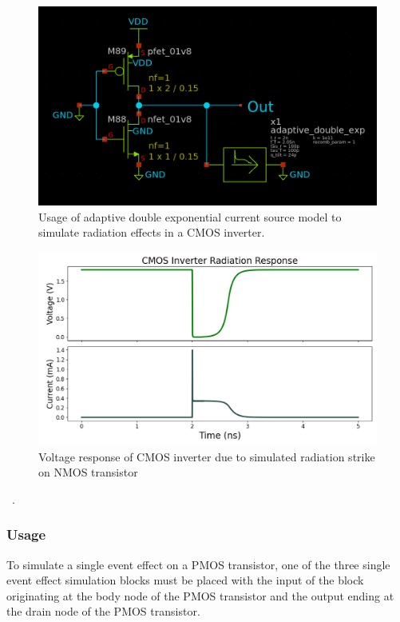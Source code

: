 \documentclass[conference]{IEEEtran}
\begin{document}
    \begin{figure}[htbp]
        \centering
        \includegraphics[width=0.9\linewidth]{Adaptive_Current_Example_Circuit}
        \caption{Usage of adaptive double exponential current source model to simulate radiation effects in a CMOS inverter.}
        \label{fig:adaptive_model_example}
    \end{figure}


    \begin{figure}[htbp]
        \centering
        \includegraphics[width=0.95\linewidth]{Inverter_Response}
        \caption{Voltage response of CMOS inverter due to simulated radiation strike on NMOS transistor}
        \label{fig:inverter_response}
    \end{figure}~\cite{Kauppila2009}.

    \subsubsection{Usage}
    To simulate a single event effect on a PMOS transistor, one of the three single event effect simulation blocks must be placed with the input of the block originating at the body node of the PMOS transistor and the output ending at the drain node of the PMOS transistor.
\end{document}
